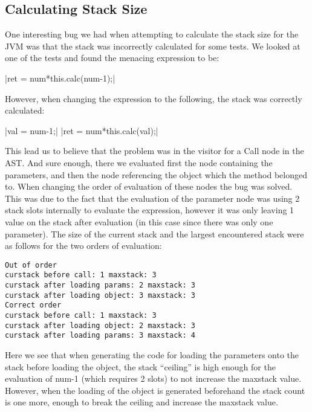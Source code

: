 \documentclass[paper=a4, fontsize=11pt]{scrartcl} %
\numberwithin{equation}{section} %
\numberwithin{figure}{section} %
\numberwithin{table}{section} %
\begin{document}
\subsection{Calculating Stack Size}
One interesting bug we had when attempting to calculate the stack size for the JVM was that the stack was incorrectly calculated for some tests. We looked at one of the tests and found the menacing expression to be:

|ret = num*this.calc(num-1);|

However, when changing the expression to the following, the stack was correctly calculated:

|val = num-1;|
|ret = num*this.calc(val);|

This lead us to believe that the problem was in the visitor for a Call node in the AST. And sure enough, there we evaluated first the node containing the parameters, and then the node referencing the object which the method belonged to. When changing the order of evaluation of these nodes the bug was solved. This was due to the fact that the evaluation of the parameter node was using 2 stack slots internally to evaluate the expression, however it was only leaving 1 value on the stack after evaluation (in this case since there was only one parameter). The size of the current stack and the largest encountered stack were as follows for the two orders of evaluation:

\begin{verbatim}
Out of order
curstack before call: 1 maxstack: 3
curstack after loading params: 2 maxstack: 3
curstack after loading object: 3 maxstack: 3
Correct order
curstack before call: 1 maxstack: 3
curstack after loading object: 2 maxstack: 3
curstack after loading params: 3 maxstack: 4
\end{verbatim}

Here we see that when generating the code for loading the parameters onto the stack before loading the object, the stack “ceiling” is high enough for the evaluation of num-1 (which requires 2 slots) to not increase the maxstack value. However, when the loading of the object is generated beforehand the stack count is one more, enough to break the ceiling and increase the maxstack value.
\end{document}
